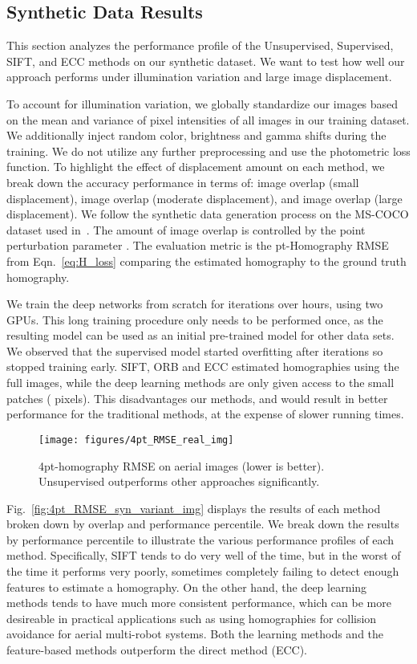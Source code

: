 \documentclass[letterpaper, 10 pt, conference]{ieeeconf}
\begin{document}
\subsection{Synthetic Data Results}
This section analyzes the performance profile of the Unsupervised, Supervised, SIFT, and ECC methods on our synthetic dataset. We want to test how well our approach performs under illumination variation and large image displacement.

To account for illumination variation, we globally standardize our images based on the mean and variance of pixel intensities of all images in our training dataset. We additionally inject random color, brightness and gamma shifts during the training. We do not utilize any further preprocessing and use the  photometric loss function. To highlight the effect of displacement amount on each method, we break down the accuracy performance in terms of:  image overlap (small displacement),  image overlap (moderate displacement), and  image overlap (large displacement). We follow the synthetic data generation process on the MS-COCO dataset used in~\cite{detone2016}. The amount of image overlap is controlled by the point perturbation parameter . The evaluation metric is the pt-Homography RMSE from Eqn.~\eqref{eq:H_loss} comparing the estimated homography to the ground truth homography. 

We train the deep networks from scratch for  iterations over  hours, using two GPUs. This long training procedure only needs to be performed once, as the resulting model can be used as an initial pre-trained model for other data sets. We observed that the supervised model started overfitting after  iterations so stopped training early. SIFT, ORB and ECC estimated homographies using the full images, while the deep learning methods are only given access to the small patches ( pixels). This disadvantages our methods, and would result in better performance for the traditional methods, at the expense of slower running times.

\begin{figure}
\centering
\texttt{[image: figures/4pt\_RMSE\_real\_img]}
\caption{4pt-homography RMSE on aerial images (lower is better). Unsupervised outperforms other approaches significantly.}
\label{fig:4pt_RMSE_real_img}
\vspace{-4mm}
\end{figure}

Fig.~\ref{fig:4pt_RMSE_syn_variant_img} displays the results of each method broken down by overlap and performance percentile. We break down the results by performance percentile to illustrate the various performance profiles of each method. Specifically, SIFT tends to do very well  of the time, but in the worst  of the time it performs very poorly, sometimes completely failing to detect enough features to estimate a homography. On the other hand, the deep learning methods tends to have much more consistent performance, which can be more desireable in practical applications such as using homographies for collision avoidance for aerial multi-robot systems. Both the learning methods and the feature-based methods outperform the direct method (ECC). 
\end{document}
